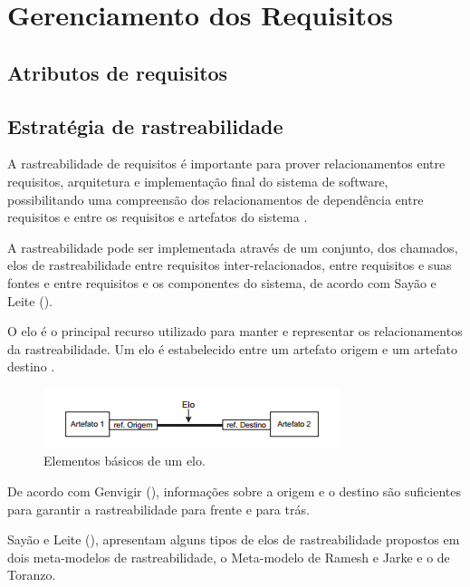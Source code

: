 \chapter[Gerenciamento dos Requisitos]{Gerenciamento dos Requisitos}

  \section{Atributos de requisitos}
  
  \section{Estratégia de rastreabilidade}
  
  A rastreabilidade de requisitos é importante para prover relacionamentos entre requisitos, 
  arquitetura e implementação final do sistema de software, 
  possibilitando uma compreensão dos relacionamentos de dependência entre 
  requisitos e entre os requisitos e artefatos do sistema \cite{sayao05}.
  
  A rastreabilidade pode ser implementada através de um conjunto,
  dos chamados, elos de rastreabilidade entre requisitos inter-relacionados, 
  entre requisitos e suas fontes e entre requisitos e os componentes do sistema, 
  de acordo com Sayão e Leite (\citeyear{sayao05}).
  
  O elo é o principal recurso utilizado para manter e representar os relacionamentos da rastreabilidade. 
  Um elo é estabelecido entre um artefato origem e um artefato destino \cite{genvigir09}.
  
  \begin{figure}[!htbp]
    \centering
    \includegraphics[scale=1]{editaveis/figuras/elo}
    \caption[Elementos básicos de um elo.] {Elementos básicos de um elo. \footnotemark}
    \label{elo}
  \end{figure}
  
  De acordo com Genvigir (\citeyear{genvigir09}), 
  informações sobre a origem e o destino são suficientes para garantir a rastreabilidade para frente e para trás.
  
  Sayão e Leite (\citeyear{sayao05}), apresentam alguns tipos de elos de rastreabilidade 
  propostos em dois meta-modelos de rastreabilidade, 
  o Meta-modelo de Ramesh e Jarke e o de Toranzo.

